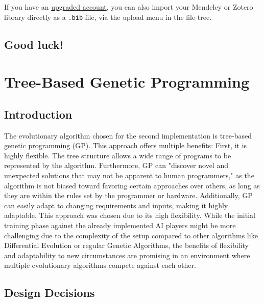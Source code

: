 \documentclass[sigconf]{acmart} %
\begin{document}
If you have an \href{https://www.overleaf.com/user/subscription/plans}{upgraded account}, you can also import your Mendeley or Zotero library directly as a \verb|.bib| file, via the upload menu in the file-tree.

\subsection{Good luck!}


\section{Tree-Based Genetic Programming}
\subsection{Introduction}

The evolutionary algorithm chosen for the second implementation is tree-based genetic programming (GP). This approach offers multiple benefits: 
First, it is highly flexible. The tree structure allows a wide range of programs to be represented by the algorithm. 
Furthermore, GP can "discover novel and unexpected solutions that may not be apparent to human programmers," as the algorithm is not biased toward favoring certain approaches over others, as long as they are within the rules set by the programmer or hardware. 
Additionally, GP can easily adapt to changing requirements and inputs, making it highly adaptable. 
This approach was chosen due to its high flexibility. While the initial training phase against the already implemented AI players might be more challenging due to the complexity of the setup compared to other algorithms like Differential Evolution or regular Genetic Algorithms, the benefits of flexibility and adaptability to new circumstances are promising in an environment where multiple evolutionary algorithms compete against each other. 

\subsection{Design Decisions}
\end{document}
